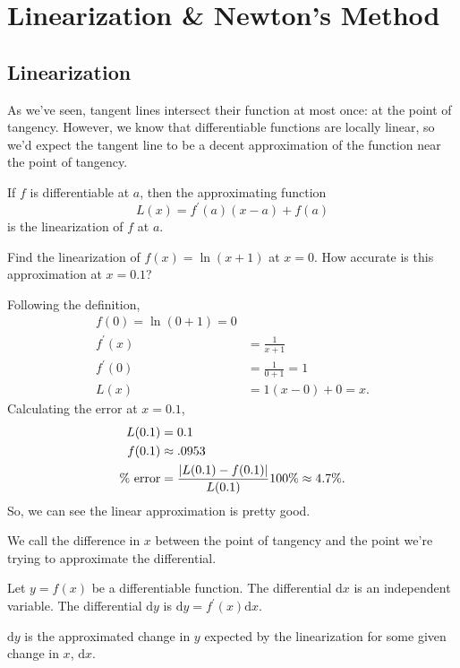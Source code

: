 \section{Linearization \& Newton's Method}

\subsection{Linearization}
As we've seen, tangent lines intersect their function at most once: at the point of tangency.
However, we know that differentiable functions are locally linear, so we'd expect the tangent line to be a decent approximation of the function near the point of tangency.

\begin{definition}
	If $f$ is differentiable at $a$, then the approximating function
	\begin{equation*}
		L(x) = f^\prime(a)(x-a) + f(a)
	\end{equation*}
	is the linearization of $f$ at $a$.
\end{definition}

\begin{example}
	Find the linearization of $f(x) = \ln{(x+1)}$ at $x=0$.
	How accurate is this approximation at $x=0.1$?
\end{example}
Following the definition,
\begin{align*}
	f(0) = \ln{(0+1)} = 0 \\
	f^\prime(x) &= \frac{1}{x+1} \\
	f^\prime(0) &= \frac{1}{0+1} = 1 \\
	L(x) &= 1(x-0) + 0 = x.
\end{align*}
\indent
Calculating the error at $x=0.1$,
\begin{align*} 
	L(0.1) &= 0.1 \\
	f(0.1) &\approx .0953 \\
	\text{\% error} &= \frac{\lvert L(0.1)-f(0.1) \rvert}{L(0.1)}100\text{\%} \approx 4.7\text{\%}.
\end{align*}
\indent
So, we can see the linear approximation is pretty good.

\noindent
We call the difference in $x$ between the point of tangency and the point we're trying to approximate the differential.
\begin{definition}
	Let $y=f(x)$ be a differentiable function.
	The differential $\mathrm{d}x$ is an independent variable.
	The differential $\mathrm{d}y$ is $\mathrm{d}y = f^\prime(x)\mathrm{d}x$.
\end{definition}
\noindent
$\mathrm{d}y$ is the approximated change in $y$ expected by the linearization for some given change in $x$, $\mathrm{d}x$.

